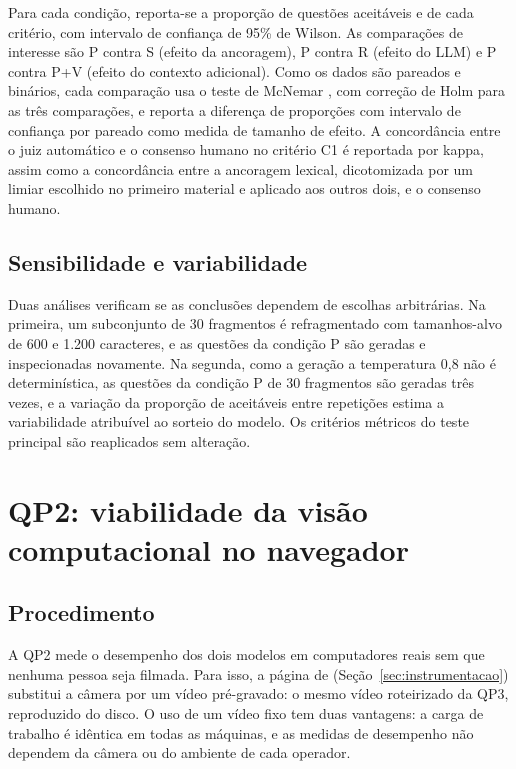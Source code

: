 Para cada condição, reporta-se a proporção de questões aceitáveis e de cada critério, com intervalo de confiança de 95\% de Wilson. As comparações de interesse são P contra S (efeito da ancoragem), P contra R (efeito do LLM) e P contra P+V (efeito do contexto adicional). Como os dados são pareados e binários, cada comparação usa o teste de McNemar \cite{McN47}, com correção de Holm para as três comparações, e reporta a diferença de proporções com intervalo de confiança por  pareado como medida de tamanho de efeito. A concordância entre o juiz automático e o consenso humano no critério C1 é reportada por kappa, assim como a concordância entre a ancoragem lexical, dicotomizada por um limiar escolhido no primeiro material e aplicado aos outros dois, e o consenso humano.

\subsection{Sensibilidade e variabilidade}

Duas análises verificam se as conclusões dependem de escolhas arbitrárias. Na primeira, um subconjunto de 30 fragmentos é refragmentado com tamanhos-alvo de 600 e 1.200 caracteres, e as questões da condição P são geradas e inspecionadas novamente. Na segunda, como a geração a temperatura 0,8 não é determinística, as questões da condição P de 30 fragmentos são geradas três vezes, e a variação da proporção de aceitáveis entre repetições estima a variabilidade atribuível ao sorteio do modelo. Os critérios métricos do teste principal são reaplicados sem alteração.

\section{\label{sec:met-qp2}QP2: viabilidade da visão computacional no navegador}

\subsection{Procedimento}

A QP2 mede o desempenho dos dois modelos em computadores reais sem que nenhuma pessoa seja filmada. Para isso, a página de  (Seção~\ref{sec:instrumentacao}) substitui a câmera por um vídeo pré-gravado: o mesmo vídeo roteirizado da QP3, reproduzido do disco. O uso de um vídeo fixo tem duas vantagens: a carga de trabalho é idêntica em todas as máquinas, e as medidas de desempenho não dependem da câmera ou do ambiente de cada operador.

